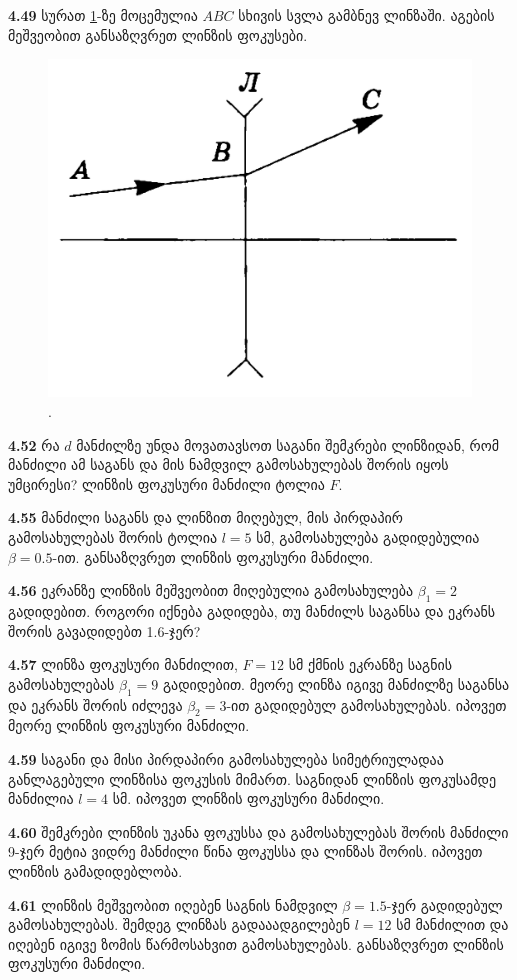 \documentclass[a4paper]{book}
\begin{document}
\textbf{4.49} სურათ \ref{fig:4_49}-ზე მოცემულია $ABC$ სხივის სვლა გამბნევ ლინზაში. აგების მეშვეობით განსაზღვრეთ ლინზის ფოკუსები. 
		\begin{figure}[h]
		   \centering
           \includegraphics[width=0.4\columnwidth]{figures/4_49}
           \caption{.}
           \label{fig:4_49}
        \end{figure}

\textbf{4.52} რა $d$ მანძილზე უნდა მოვათავსოთ საგანი შემკრები ლინზიდან, რომ მანძილი ამ საგანს და მის ნამდვილ გამოსახულებას შორის იყოს უმცირესი? ლინზის ფოკუსური მანძილი ტოლია $F$.

\textbf{4.55} მანძილი საგანს და ლინზით მიღებულ, მის პირდაპირ გამოსახულებას შორის ტოლია $l = 5$ სმ, გამოსახულება გადიდებულია $\beta = 0.5$-ით. განსაზღვრეთ ლინზის ფოკუსური მანძილი.

\textbf{4.56} ეკრანზე ლინზის მეშვეობით მიღებულია გამოსახულება $\beta_1 = 2$ გადიდებით. როგორი იქნება გადიდება, თუ მანძილს საგანსა და ეკრანს შორის გავადიდებთ 1.6-ჯერ?

\textbf{4.57} ლინზა ფოკუსური მანძილით, $F = 12$ სმ ქმნის ეკრანზე საგნის გამოსახულებას $\beta_1 = 9$ გადიდებით. მეორე ლინზა იგივე მანძილზე საგანსა და ეკრანს შორის იძლევა $\beta_2 = 3$-ით გადიდებულ გამოსახულებას. იპოვეთ მეორე ლინზის ფოკუსური მანძილი.

\textbf{4.59} საგანი და მისი პირდაპირი გამოსახულება სიმეტრიულადაა განლაგებული ლინზისა ფოკუსის მიმართ. საგნიდან ლინზის ფოკუსამდე მანძილია $l = 4$ სმ. იპოვეთ ლინზის ფოკუსური მანძილი.

\textbf{4.60} შემკრები ლინზის უკანა ფოკუსსა და გამოსახულებას შორის მანძილი 9-ჯერ მეტია ვიდრე მანძილი წინა ფოკუსსა და ლინზას შორის. იპოვეთ ლინზის გამადიდებლობა.
       
\textbf{4.61} ლინზის მეშვეობით იღებენ საგნის ნამდვილ $\beta = 1.5$-ჯერ გადიდებულ გამოსახულებას. შემდეგ ლინზას გადააადგილებენ $l = 12$ სმ მანძილით და იღებენ იგივე ზომის წარმოსახვით გამოსახულებას. განსაზღვრეთ ლინზის ფოკუსური მანძილი.
\end{document}
